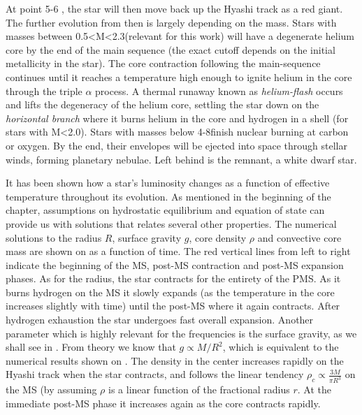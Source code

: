 At point 5-6 , the star will then move back up the Hyashi track as a red giant. The further evolution from then is largely depending on the mass. Stars with masses between 0.5<M<2.3\msun (relevant for this work) will have a degenerate helium core by the end of the main sequence (the exact cutoff depends on the initial metallicity in the star). The core contraction following the main-sequence continues until it reaches a temperature high enough to ignite helium in the core through the triple $\alpha$ process.   A thermal runaway known as \textit{helium-flash} occurs and lifts the degeneracy of the helium core, settling the star down on the \textit{horizontal branch} where it burns helium in the core and hydrogen in a shell (for stars with M<2.0\msun). 
 Stars with masses below 4-8\msun finish nuclear burning  at carbon or oxygen. By the end, their envelopes will be ejected into space through stellar winds, forming planetary nebulae. Left behind is the remnant, a white dwarf star.

It has been shown how a star's luminosity changes as a function of effective temperature throughout its evolution. As mentioned in the beginning of the chapter, assumptions on hydrostatic equilibrium and equation of state can provide us with solutions that relates several other properties. The numerical solutions to the radius $R$,  surface gravity  $g$, core density $\rho$ and convective core mass are shown on  as a function of time. The red vertical lines from left to right indicate the beginning of the MS, post-MS contraction and post-MS expansion phases. As for the radius, the star contracts for the entirety of the PMS. As it burns hydrogen on the MS it slowly expands (as the temperature in the core increases slightly with time) until the post-MS where it again contracts. After hydrogen exhaustion the star undergoes fast overall expansion. Another parameter which is highly relevant for the frequencies is the surface gravity, as we shall see in . From theory we know that $g \propto M/R^2$, which is equivalent to the numerical results shown on . The density in the center increases rapidly on the Hyashi track when the star contracts, and follows the linear tendency $\rho_c \propto \frac{3M}{\pi R^3}$ on the MS (by assuming $\rho$ is a linear function of the fractional radius $r$. At the immediate post-MS phase it increases again as the core contracts rapidly. 

